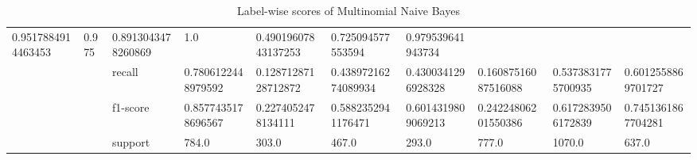 \begin{table}[h!]
{\begin{tabular}{@{}ccllllllll@{}}
  \multicolumn{1}{l|}{0.9517884914463453} &
  \multicolumn{1}{l|}{0.975} &
  \multicolumn{1}{l|}{0.8913043478260869} &
  \multicolumn{1}{l|}{1.0} &
  \multicolumn{1}{l|}{0.49019607843137253} &
  \multicolumn{1}{l|}{0.725094577553594} &
  \multicolumn{1}{l|}{0.979539641943734} \\ \cmidrule(l){3-10} 
\multicolumn{1}{|c|}{} &
  \multicolumn{1}{c|}{} &
  \multicolumn{1}{l|}{recall} &
  \multicolumn{1}{l|}{0.7806122448979592} &
  \multicolumn{1}{l|}{0.12871287128712872} &
  \multicolumn{1}{l|}{0.43897216274089934} &
  \multicolumn{1}{l|}{0.4300341296928328} &
  \multicolumn{1}{l|}{0.16087516087516088} &
  \multicolumn{1}{l|}{0.5373831775700935} &
  \multicolumn{1}{l|}{0.6012558869701727} \\ \cmidrule(l){3-10} 
\multicolumn{1}{|c|}{} &
  \multicolumn{1}{c|}{} &
  \multicolumn{1}{l|}{f1-score} &
  \multicolumn{1}{l|}{0.8577435178696567} &
  \multicolumn{1}{l|}{0.2274052478134111} &
  \multicolumn{1}{l|}{0.5882352941176471} &
  \multicolumn{1}{l|}{0.6014319809069213} &
  \multicolumn{1}{l|}{0.24224806201550386} &
  \multicolumn{1}{l|}{0.6172839506172839} &
  \multicolumn{1}{l|}{0.7451361867704281} \\ \cmidrule(l){3-10} 
\multicolumn{1}{|c|}{} &
  \multicolumn{1}{c|}{} &
  \multicolumn{1}{l|}{support} &
  \multicolumn{1}{l|}{784.0} &
  \multicolumn{1}{l|}{303.0} &
  \multicolumn{1}{l|}{467.0} &
  \multicolumn{1}{l|}{293.0} &
  \multicolumn{1}{l|}{777.0} &
  \multicolumn{1}{l|}{1070.0} &
  \multicolumn{1}{l|}{637.0} \\ \bottomrule
\end{tabular}%
}
\caption{Label-wise scores of Multinomial Naive Bayes}
\label{tab:Label-wise-Naiye-Bayes}
\end{table}

